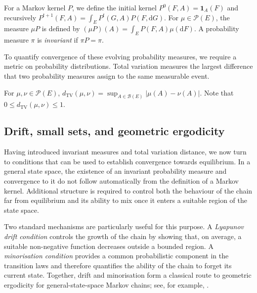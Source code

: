 \begin{definition}\label{def:Iterated kernels and action on measures}
For a Markov kernel \(P\), we define the initial kernel \(P^0(F,A)=\mathbf 1_A(F)\) and recursively
\(
P^{t+1}(F,A)=\int_E P^t(G,A)P(F,\mathrm dG).
\)
For \(\mu\in\mathcal P(E)\), the measure \(\mu P\) is defined by \((\mu P)(A)=\int_E P(F,A)\mu(\mathrm dF)\). A probability measure \(\pi\) is \emph{invariant} if \(\pi P=\pi\).
\end{definition}

To quantify convergence of these evolving probability measures, we require a metric on probability distributions. Total variation measures the largest difference that two probability measures assign to the same measurable event.

\begin{definition}\label{def:Total variation distance}
For \(\mu,\nu\in\mathcal P(E)\),
\(
d_{\mathrm{TV}}(\mu,\nu)=\sup_{A\in\mathcal B(E)}|\mu(A)-\nu(A)|.
\)
Note that \(0\leqslant d_{\mathrm{TV}}(\mu,\nu)\leqslant1\).
\end{definition}

\subsection{Drift, small sets, and geometric ergodicity}\label{subsec:Drift small sets and geometric ergodicity}

Having introduced invariant measures and total variation distance, we now turn to conditions that can be used to establish convergence towards equilibrium. In a general state space, the existence of an invariant probability measure and convergence to it do not follow automatically from the definition of a Markov kernel. Additional structure is required to control both the behaviour of the chain far from equilibrium and its ability to mix once it enters a suitable region of the state space.

Two standard mechanisms are particularly useful for this purpose. A \emph{Lyapunov drift condition} controls the growth of the chain by showing that, on average, a suitable non-negative function decreases outside a bounded region. A \emph{minorisation condition} provides a common probabilistic component in the transition laws and therefore quantifies the ability of the chain to forget its current state. Together, drift and minorisation form a classical route to geometric ergodicity for general-state-space Markov chains; see, for example, \cite{MeynTweedie2009}.

